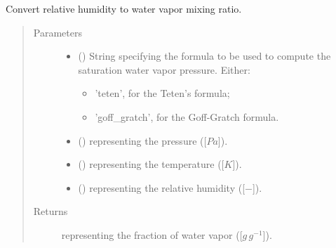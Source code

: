 \documentclass[letterpaper,10pt,english]{sphinxmanual}
\begin{document}
\begin{fulllineitems}
\label{\detokenize{api:tasmania.utils.utils_meteo.convert_relative_humidity_to_water_vapor}}
Convert relative humidity to water vapor mixing ratio.
\begin{quote}\begin{description}
\item[{Parameters}] \leavevmode\begin{itemize}
\item {} 
 () \textendash{} 
String specifying the formula to be used to compute the saturation water vapor pressure. Either:
\begin{itemize}
\item {} 
’teten’, for the Teten’s formula;

\item {} 
’goff\_gratch’, for the Goff-Gratch formula.

\end{itemize}


\item {} 
 () \textendash{}  representing the pressure ({[}\(Pa\){]}).

\item {} 
 () \textendash{}  representing the temperature ({[}\(K\){]}).

\item {} 
 () \textendash{}  representing the relative humidity ({[}\(-\){]}).

\end{itemize}

\item[{Returns}] \leavevmode
{} representing the fraction of water vapor ({[}\(g \, g^{-1}\){]}).


\end{description}
\end{quote}
\end{fulllineitems}
\end{document}
